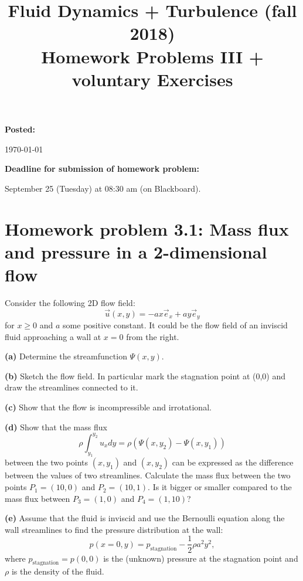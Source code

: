\documentclass[a4paper, 10pt]{article}
\title{Fluid Dynamics + Turbulence (fall 2018)\\Homework Problems III + voluntary Exercises}
\author{}
\date{}
\begin{document}
\maketitle

\large{
\textbf{Posted:}

\today

\bigskip
\textbf{Deadline for submission of homework problem:}

September 25 (Tuesday) at 08:30 am (on Blackboard).
}

\bigskip

\section*{Homework problem 3.1: Mass flux and pressure in a 2-dimensional flow}
Consider the following 2D flow field:
\begin{equation}
\vec{u}(x,y)=-ax\vec{e}_x+ay\vec{e}_y
\end{equation}
for $x\geq0$ and $a$ some positive constant. It could be the flow field of an inviscid fluid approaching a wall at $x=0$ from the right. \newline

{\bf (a)} Determine the streamfunction $\Psi(x,y)$.\newline

{\bf (b)} Sketch the flow field. In particular mark the stagnation point at (0,0) and draw the streamlines connected to it. \newline

{\bf (c)} Show that the flow is incompressible and irrotational. \newline

{\bf (d)} Show that the mass flux
\begin{equation}
\rho\int_{y_1}^{y_2} u_xdy=\rho(\Psi(x,y_2)-\Psi(x,y_1))
\end{equation}
between the two points $(x,y_1)$ and $(x,y_2)$ can be expressed as the difference between the values of two streamlines. Calculate the mass flux between the two points $P_1=(10,0)$ and $P_2=(10,1)$. Is it bigger or smaller compared to the mass flux between $P_3=(1,0)$ and $P_4=(1,10)$? \newline

{\bf (e)} Assume that the fluid is inviscid and use the Bernoulli equation along the wall streamlines to find the pressure distribution at the wall:
\begin{equation}
p(x=0,y) = p_\mathrm{stagnation}-\frac{1}{2}\rho a^2y^2,
\end{equation}
where $p_\mathrm{stagnation} = p(0,0)$ is the (unknown) pressure at the stagnation point and $\rho$ is the density of the fluid. \newline
\end{document}
